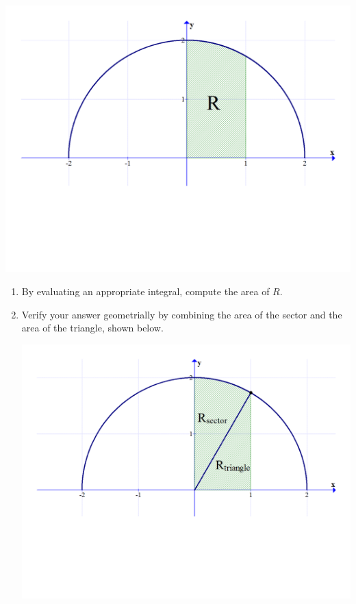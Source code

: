 \documentclass[12pt]{article}
\newif\ifans
\begin{document}
\begin{enumerate}
\begin{center}
\includegraphics[scale=0.4]{area.pdf}
\end{center}

\begin{enumerate}

\item By evaluating an appropriate integral, compute the area of $R$.

\ifans{\fbox{$A=\int_0^1 \sqrt{4-x^2} \,dx=\frac{\pi}{3}+\frac{\sqrt{3}}{2}$}} \fi

\item Verify your answer geometrially by combining the area of the sector and the area of the triangle, shown below.

\begin{center}
\includegraphics[scale=0.4]{area2.pdf}
\end{center}

\ifans{\fbox{$R_{\text{Triangle}}=\frac{1}{2}bh=\frac{1}{2}(1)\left(\sqrt{3}\right)=\frac{\sqrt{3}}{2}$; $R_{\text{Sector}}=\frac{1}{2}r^2\theta=\frac{1}{2}(2)^2\left(\frac{\pi}{6}\right)=\frac{\pi}{3}$}} \fi

\end{enumerate}

\end{enumerate}
\end{document}
